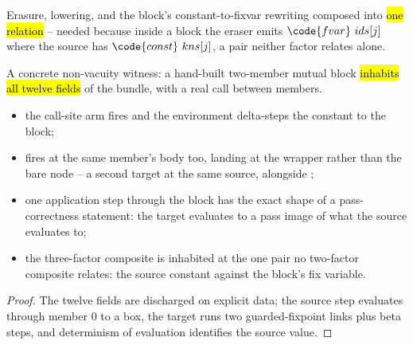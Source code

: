 \begin{definition}
\label{def:ErasesLBFix}
\leanok
{}
 Erasure, lowering, and the block's constant-to-fixvar rewriting composed into
\hl{one relation} -- needed because inside a block the eraser emits $\code{fvar}\ ids[j]$ where the
source has $\code{const}\ kns[j]$, a pair neither factor relates alone.
\end{definition}

\begin{lemma}
\label{lem:LowerFixFixture-lowerfix_app_step}
\leanok
{}
 A concrete non-vacuity witness: a hand-built two-member mutual block \hl{inhabits all
twelve fields} of the bundle, with a real call between members.
\begin{itemize}
\item the call-site arm fires and the environment delta-steps the constant to the block;
\item {} fires at the same member's body too, landing at the wrapper rather than the bare
node -- a second target at the same source, alongside ;
\item one application step through the block has the exact shape of a pass-correctness statement: the
target evaluates to a pass image of what the source evaluates to;
\item the three-factor composite is inhabited at the one pair no two-factor composite relates: the
source constant against the block's fix variable.
\end{itemize}
\end{lemma}
\begin{proof}
\leanok
{}
 The twelve fields are discharged on explicit data; the source step evaluates through
member $0$ to a box, the target runs two guarded-fixpoint links plus beta steps, and determinism of
evaluation identifies the source value.
\end{proof}

